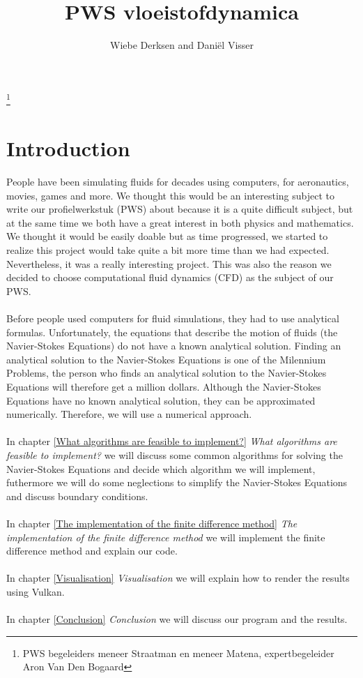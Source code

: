 \documentclass{article}
\title{PWS vloeistofdynamica}
\author{Wiebe Derksen and Daniël Visser}
\begin{document}
\maketitle
\thispagestyle{empty}
\hfil
\thanks{PWS begeleiders meneer Straatman en meneer Matena, expertbegeleider Aron Van Den Bogaard}
\newpage
\tableofcontents
\newpage
\section{Introduction}
People have been simulating fluids for decades using computers, for aeronautics, movies, games and more. We thought this would be an interesting subject to write our profielwerkstuk (PWS) about because it is a quite difficult subject, but at the same time we both have a great interest in both physics and mathematics. We thought it would be easily doable but as time progressed, we started to realize this project would take quite a bit more time than we had expected. Nevertheless, it was a really interesting project. This was also the reason we decided to choose computational fluid dynamics (CFD) as the subject of our PWS.
\\ \\
Before people used computers for fluid simulations, they had to use analytical formulas. Unfortunately, the equations that describe the motion of fluids (the Navier-Stokes Equations) do not have a known analytical solution. Finding an analytical solution to the Navier-Stokes Equations is one of the Milennium Problems\cite{Millenium Problems}, the person who finds an analytical solution to the Navier-Stokes Equations will therefore get a million dollars. Although the Navier-Stokes Equations have no known analytical solution, they can be approximated numerically. Therefore, we will use a numerical approach.
\\ \\
In chapter \ref{What algorithms are feasible to implement?} \textit{What algorithms are feasible to implement?} we will discuss some common algorithms for solving the Navier-Stokes Equations and decide which algorithm we will implement, futhermore we will do some neglections to simplify the Navier-Stokes Equations and discuss boundary conditions. 
\\ \\
In chapter \ref{The implementation of the finite difference method} \textit{The implementation of the finite difference method} we will implement the finite difference method and explain our code.
\\ \\
In chapter \ref{Visualisation} \textit{Visualisation} we will explain how to render the results using Vulkan.
\\ \\
In chapter \ref{Conclusion} \textit{Conclusion} we will discuss our program and the results.
\end{document}
